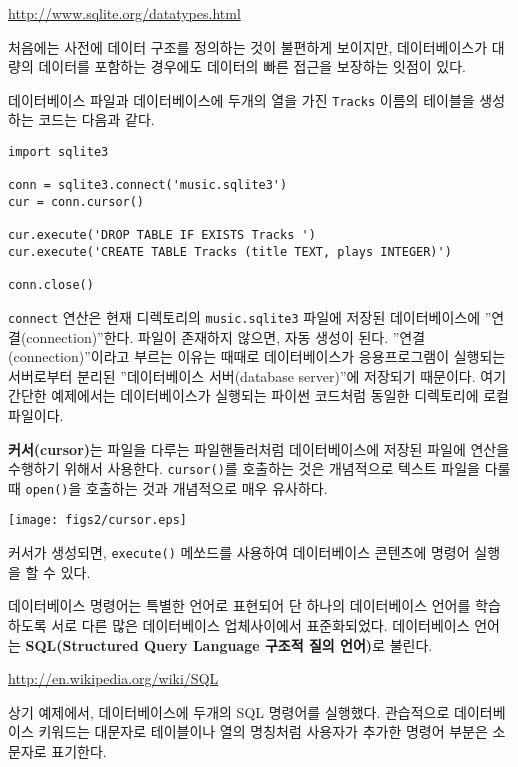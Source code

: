 \url{http://www.sqlite.org/datatypes.html}

처음에는 사전에 데이터 구조를 정의하는 것이 불편하게 보이지만, 데이터베이스가 대량의 데이터를 포함하는 경우에도 데이터의 빠른 접근을 보장하는 잇점이 있다.

데이터베이스 파일과 데이터베이스에 두개의 열을 가진 {\tt Tracks} 이름의 테이블을 생성하는 코드는 다음과 같다.

\beforeverb
\begin{verbatim}
import sqlite3

conn = sqlite3.connect('music.sqlite3')
cur = conn.cursor()

cur.execute('DROP TABLE IF EXISTS Tracks ')
cur.execute('CREATE TABLE Tracks (title TEXT, plays INTEGER)')

conn.close()
\end{verbatim}
\afterverb
%


{\tt connect} 연산은 현재 디렉토리의 {\tt music.sqlite3} 파일에 저장된 데이터베이스에 ''연결(connection)''한다.
파일이 존재하지 않으면, 자동 생성이 된다. ''연결(connection)''이라고 부르는 이유는 때때로 데이터베이스가 응용프로그램이 실행되는 서버로부터
분리된 ''데이터베이스 서버(database server)''에 저장되기 때문이다.
여기 간단한 예제에서는 데이터베이스가 실행되는 파이썬 코드처럼 동일한 디렉토리에 로컬 파일이다.

{\bf 커서(cursor)}는 파일을 다루는 파일핸들러처럼 데이터베이스에 저장된 파일에 연산을 수행하기 위해서 사용한다.
{\tt cursor()}를 호출하는 것은 개념적으로 텍스트 파일을 다룰 때 {\tt open()}을 호출하는 것과 개념적으로 매우 유사하다.

\beforefig
\centerline{\texttt{[image: figs2/cursor.eps]}}
\afterfig

커서가 생성되면, {\tt execute()} 메쏘드를 사용하여 데이터베이스 콘텐츠에 명령어 실행을 할 수 있다.

데이터베이스 명령어는 특별한 언어로 표현되어 단 하나의 데이터베이스 언어를 학습하도록 서로 다른 많은 데이터베이스 업체사이에서 표준화되었다.
데이터베이스 언어는 {\bf SQL(Structured Query Language 구조적 질의 언어)}로 불린다.

\url{http://en.wikipedia.org/wiki/SQL}

상기 예제에서, 데이터베이스에 두개의 SQL 명령어를 실행했다. 관습적으로 데이터베이스 키워드는 대문자로 테이블이나 열의 명칭처럼 사용자가 추가한
명령어 부분은 소문자로 표기한다.

